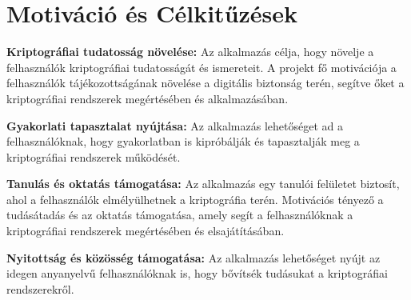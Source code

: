 \section {Motiváció és Célkitűzések}
\textbf{Kriptográfiai tudatosság növelése:}
Az alkalmazás célja, hogy növelje a felhasználók kriptográfiai tudatosságát és ismereteit. A projekt fő motivációja a felhasználók tájékozottságának növelése a digitális biztonság terén, segítve őket a kriptográfiai rendszerek megértésében és alkalmazásában.

\textbf{Gyakorlati tapasztalat nyújtása:}
Az alkalmazás lehetőséget ad a felhasználóknak, hogy gyakorlatban is kipróbálják és tapasztalják meg a kriptográfiai rendszerek működését.

\textbf{Tanulás és oktatás támogatása:}
Az alkalmazás egy tanulói felületet biztosít, ahol a felhasználók elmélyülhetnek a kriptográfia terén. Motivációs tényező a tudásátadás és az oktatás támogatása, amely segít a felhasználóknak a kriptográfiai rendszerek megértésében és elsajátításában.

\textbf{Nyitottság és közösség támogatása:}
Az alkalmazás lehetőséget nyújt az idegen anyanyelvű felhasználóknak is, hogy bővítsék tudásukat a kriptográfiai rendszerekről.






